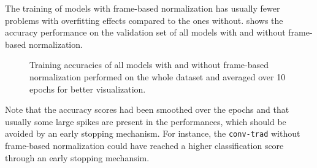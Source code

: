\FloatBarrier
\noindent
The training of models with frame-based normalization has usually fewer problems with overfitting effects compared to the ones without.
 shows the accuracy performance on the validation set of all models with and without frame-based normalization.
\begin{figure}[!ht]
  \centering
  \quad
  \caption{Training accuracies of all models with and without frame-based normalization performed on the whole dataset and averaged over 10 epochs for better visualization.}
  \label{fig:exp_final_acc}
\end{figure}
\FloatBarrier
\noindent
Note that the accuracy scores had been smoothed over the epochs and that usually some large spikes are present in the performances, which should be avoided by an early stopping mechanism.
For instance, the \texttt{conv-trad} without frame-based normalization could have reached a higher classification score through an early stopping mechansim.

